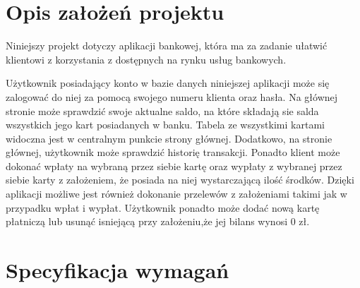 \documentclass[12pt, letterpaper]{article}
\begin{document}
\newpage

\tableofcontents

\newpage

\section{Opis założeń projektu}

\quad Niniejszy projekt dotyczy aplikacji bankowej, która ma za zadanie ułatwić klientowi
z korzystania z dostępnych na rynku usług bankowych.

\quad Użytkownik posiadający konto w bazie danych niniejszej aplikacji może się zalogować do niej za pomocą swojego numeru klienta oraz hasła. Na głównej stronie może sprawdzić swoje aktualne saldo, na które składają sie salda wszystkich jego kart posiadanych w banku. Tabela ze wszystkimi kartami widoczna jest w centralnym punkcie strony głównej. Dodatkowo, na stronie głównej, użytkownik może sprawdzić historię transakcji. Ponadto klient może dokonać wpłaty na wybraną przez siebie kartę oraz wypłaty z wybranej przez siebie karty z założeniem, że posiada na niej wystarczającą ilość środków. Dzięki aplikacji możliwe jest również dokonanie przelewów z założeniami takimi 
jak w przypadku wpłat i wypłat. Użytkownik ponadto może dodać nową kartę płatniczą lub usunąć isniejącą przy 
założeniu,że jej bilans wynosi 0 zł.

\newpage

\section{Specyfikacja wymagań}
\end{document}
